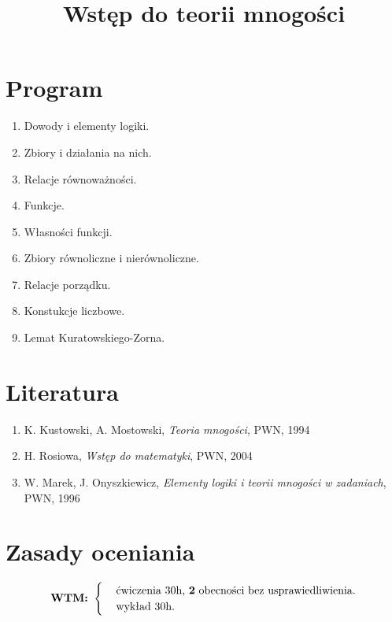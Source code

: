 \documentclass[a5paper,8pt]{article}
\title{Wstęp do teorii mnogości}
\author{}
\date{}
\theoremstyle{mythmstyle}
\begin{document}
    \maketitle
    \tableofcontents
    \pagebreak

    \section{Program} %
    \label{sec:program}
        \begin{enumerate}
            \item Dowody i elementy logiki.
            \item Zbiory i działania na nich.
            \item Relacje równoważności.
            \item Funkcje.
            \item Własności funkcji.
            \item Zbiory równoliczne i nierównoliczne.
            \item Relacje porządku.
            \item Konstukcje liczbowe.
            \item Lemat Kuratowskiego-Zorna.
        \end{enumerate}

    \section{Literatura} %
    \label{sec:literatura}
        \begin{enumerate}
            \item K. Kustowski, A. Mostowski, \textit{Teoria mnogości}, PWN, 1994
            \item H. Rosiowa, \textit{Wstęp do matematyki}, PWN, 2004
            \item W. Marek, J. Onyszkiewicz, \textit{Elementy logiki i teorii mnogości w zadaniach}, PWN, 1996
        \end{enumerate}

    \section{Zasady oceniania} %
    \label{sec:zasady_oceniania}

        \begin{equation*}
          \textbf{WTM:  }\begin{cases}
            & \text{ćwiczenia 30h, \textbf{2} obecności bez usprawiedliwienia}.\\
            & \text{wykład 30h}.
          \end{cases}
        \end{equation*}
\end{document}
